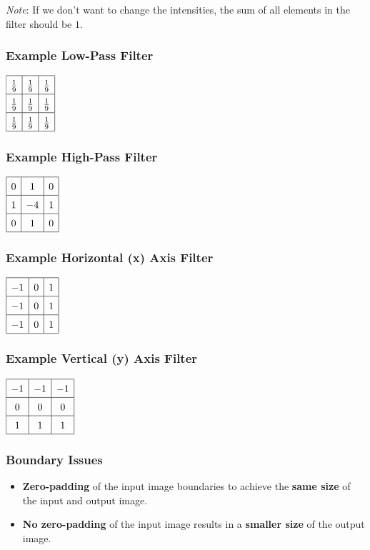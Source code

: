 \textit{Note}: If we don't want to change the intensities, the sum of all elements in the filter should be $1$.

\subsubsection{Example Low-Pass Filter}
$\renewcommand{\arraystretch}{1.5}\begin{array}{|c|c|c|}
\hline
\frac{1}{9} & \frac{1}{9} & \frac{1}{9} \\
\hline
\frac{1}{9} & \frac{1}{9} & \frac{1}{9} \\
\hline
\frac{1}{9} & \frac{1}{9} & \frac{1}{9} \\
\hline
\end{array}$

\subsubsection{Example High-Pass Filter}
$\renewcommand{\arraystretch}{1.5}\begin{array}{|c|c|c|}
\hline
0 & 1 & 0 \\
\hline
1 & -4 & 1 \\
\hline
0 & 1 & 0 \\
\hline
\end{array}$

\subsubsection{Example Horizontal (x) Axis Filter}
$\renewcommand{\arraystretch}{1.5}\begin{array}{|c|c|c|}
\hline
-1 & 0 & 1 \\
\hline
-1 & 0 & 1 \\
\hline
-1 & 0 & 1 \\
\hline
\end{array}$

\subsubsection{Example Vertical (y) Axis Filter}
$\renewcommand{\arraystretch}{1.5}\begin{array}{|c|c|c|}
\hline
-1 & -1 & -1 \\
\hline
0 & 0 & 0 \\
\hline
1 & 1 & 1 \\
\hline
\end{array}$

\subsubsection{Boundary Issues}
\begin{itemize}
  \item \textbf{Zero-padding} of the input image boundaries to achieve the \textbf{same size} of the input and output image.
  \item \textbf{No zero-padding} of the input image results in a \textbf{smaller size} of the output image.
\end{itemize}

